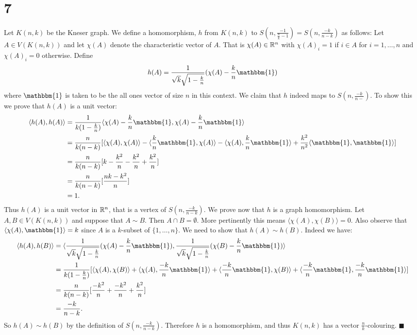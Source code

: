 \documentclass[letterpaper,12pt,oneside,onecolumn]{article}
\newcommand{\1}{\mathbbm{1}}
\begin{document}
\section*{7}
\paragraph{}
Let $K(n,k)$ be the Kneser graph. We define a homomorphism, $h$ from $K(n,k)$ to $S(n, \frac{-1}{\frac{n}{k}-1}) = S(n, \frac{-k}{n-k})$ as follows: Let $A \in V(K(n,k))$ and let $\chi(A)$ denote the characteristic vector of $A$. That is $\chi(A) \in \mathbb{R}^n$ with $\chi(A)_i = 1$ if $i \in A$ for $i =1,\dots, n$ and $\chi(A)_i = 0$ otherwise. Define
$$h(A) = \frac{1}{\sqrt{k}\sqrt{1 - \frac{k}{n}}} (\chi(A) - \frac{k}{n} \1)$$
where $\1$ is taken to be the all ones vector of size $n$ in this context. We claim that $h$ indeed maps to $S(n,\frac{-k}{n-})$. To show this we prove that $h(A)$ is a unit vector:
\begin{align*}
\langle h(A), h(A) \rangle &= \frac{1}{k(1-\frac{k}{n})}\langle \chi(A) - \frac{k}{n}\1, \chi(A) - \frac{k}{n}\1\rangle \\
&= \frac{n}{k(n-k)} [\langle \chi(A), \chi(A) \rangle - \langle \frac{k}{n}\1, \chi(A) \rangle -\langle \chi(A), \frac{k}{n}\1 \rangle + \frac{k^2}{n^2}\langle \1, \1\rangle]\\
&= \frac{n}{k(n-k)}[k - \frac{k^2}{n} - \frac{k^2}{n} + \frac{k^2}{n}] \\
&= \frac{n}{k(n-k)}[\frac{nk - k^2}{n}] \\
&= 1.
\end{align*}
Thus $h(A)$ is a unit vector in $\mathbb{R}^n$, that is a vertex of $S(n,\frac{-k}{n-k})$.
 We prove now that $h$ is a graph homomorphism. Let $A,B \in V(K(n,k))$ and suppose that $A\sim B$. Then $A\cap B = \emptyset$. More pertinently this means $\langle \chi(A), \chi(B) \rangle = 0$. Also observe that $\langle \chi(A), \1\rangle = k$ since $A$ is a $k$-subset of $\{1, \dots, n\}$. We need to show that $h(A) \sim h(B)$. Indeed we have:
\begin{align*}
\langle h(A), h(B) \rangle &= \langle  \frac{1}{\sqrt{k}\sqrt{1 - \frac{k}{n}}} (\chi(A) - \frac{k}{n} \1),  \frac{1}{\sqrt{k}\sqrt{1 - \frac{k}{n}}} (\chi(B) - \frac{k}{n} \1) \rangle \\
&= \frac{1}{k(1-\frac{k}{n})}[\langle \chi(A), \chi(B)\rangle + \langle \chi(A), \frac{-k}{n}\1\rangle + \langle \frac{-k}{n} \1, \chi(B) \rangle + \langle \frac{-k}{n} \1, \frac{-k}{n} \1\rangle] \\
&= \frac{n}{k(n-k)}[\frac{-k^2}{n} + \frac{-k^2}{n} + \frac{k^2}{n}] \\
&= \frac{-k}{n-k}.
\end{align*}
So $h(A) \sim h(B)$ by the definition of $S(n, \frac{-k}{n-k})$. Therefore $h$ is a homomorphism, and thus $K(n,k)$ has a vector $\frac{n}{k}$-colouring. $\blacksquare$
\end{document}
